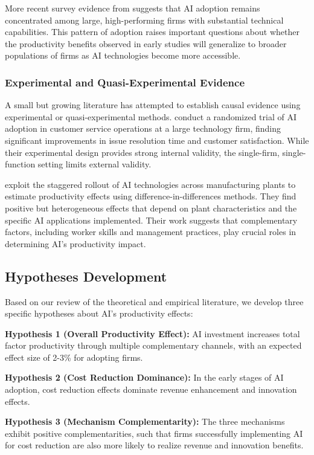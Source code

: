 \documentclass[12pt]{article}
\begin{document}
More recent survey evidence from \citet{mit2021artificial} suggests that AI adoption remains concentrated among large, high-performing firms with substantial technical capabilities. This pattern of adoption raises important questions about whether the productivity benefits observed in early studies will generalize to broader populations of firms as AI technologies become more accessible.

\subsubsection{Experimental and Quasi-Experimental Evidence}

A small but growing literature has attempted to establish causal evidence using experimental or quasi-experimental methods. \citet{chen2021artificial} conduct a randomized trial of AI adoption in customer service operations at a large technology firm, finding significant improvements in issue resolution time and customer satisfaction. While their experimental design provides strong internal validity, the single-firm, single-function setting limits external validity.

\citet{babina2024artificial} exploit the staggered rollout of AI technologies across manufacturing plants to estimate productivity effects using difference-in-differences methods. They find positive but heterogeneous effects that depend on plant characteristics and the specific AI applications implemented. Their work suggests that complementary factors, including worker skills and management practices, play crucial roles in determining AI's productivity impact.

\subsection{Hypotheses Development}

Based on our review of the theoretical and empirical literature, we develop three specific hypotheses about AI's productivity effects:

\textbf{Hypothesis 1 (Overall Productivity Effect):} AI investment increases total factor productivity through multiple complementary channels, with an expected effect size of 2-3\% for adopting firms.

\textbf{Hypothesis 2 (Cost Reduction Dominance):} In the early stages of AI adoption, cost reduction effects dominate revenue enhancement and innovation effects.

\textbf{Hypothesis 3 (Mechanism Complementarity):} The three mechanisms exhibit positive complementarities, such that firms successfully implementing AI for cost reduction are also more likely to realize revenue and innovation benefits.
\end{document}
